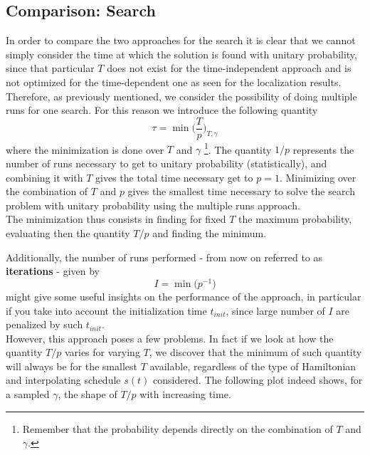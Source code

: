    \subsection{Comparison: Search}
        In order to compare the two approaches for the search it is clear that we cannot simply consider the time at which the solution is found with unitary probability, since that particular $T$ does not exist for the time-independent approach and is not optimized for the time-dependent one as seen for the localization results. Therefore, as previously mentioned, we consider the possibility of doing multiple runs for one search. For this reason we introduce the following quantity
        \begin{equation}
          \tau = \min\bigg(\frac{T}{p}\bigg)_{T, \gamma}
        \end{equation}
        where the minimization is done over $T$ and $\gamma$ \footnote{Remember that the probability depends directly on the combination of $T$ and $\gamma$.}. The quantity $1/p$ represents the number of runs necessary to get to unitary probability (statistically), and combining it with $T$ gives the total time necessary get to $p=1$. Minimizing over the combination of $T$ and $p$ gives the smallest time necessary to solve the search problem with unitary probability using the multiple runs approach.\\ The minimization thus consists in finding for fixed $T$ the maximum probability, evaluating then the quantity $T/p$ and finding the minimum.

        \noindent
        Additionally, the number of runs performed - from now on referred to as \textbf{iterations} - given by
        \begin{equation}
          I = \min\big(p^{-1}\big)
        \end{equation}
        might give some useful insights on the performance of the approach, in particular if you take into account the initialization time $t_{init}$, since large number of $I$ are penalized by such $t_{init}$.\\


        \noindent
        However, this approach poses a few problems. In fact if we look at how the quantity $T/p$ varies for varying $T$, we discover that the minimum of such quantity will always be for the smallest $T$ available, regardless of the type of Hamiltonian and interpolating schedule $s(t)$ considered. The following plot indeed shows, for a sampled $\gamma$, the shape of $T/p$ with increasing time. \\
        \clearpage
        

